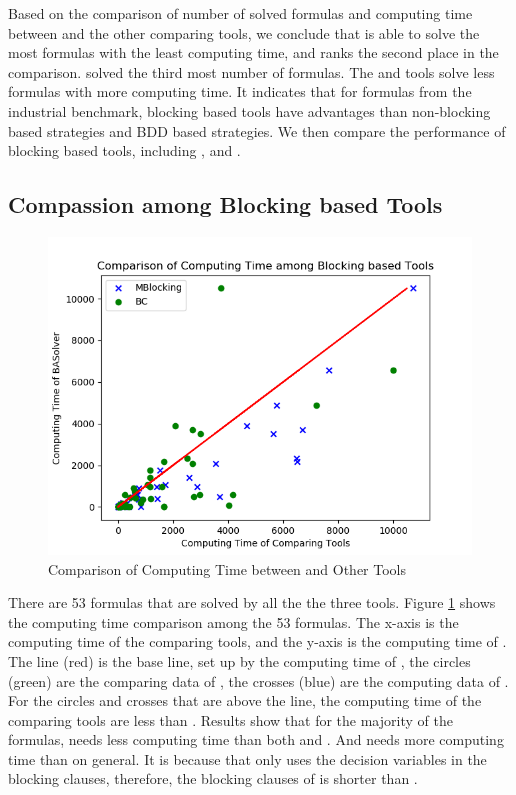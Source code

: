 Based on the comparison of number of solved formulas and computing time between \tool and the other comparing tools, we conclude that \tool is able to solve the most formulas with the least computing time, and \ctool ranks the second place in the comparison. 
\bc solved the third most number of formulas.
The \nbc and \bdd tools solve less formulas with more computing time. 
It indicates that for formulas from the industrial benchmark, blocking based tools have advantages than non-blocking based strategies and BDD based strategies.
We then compare the performance of blocking based tools, including \tool, \ctool and \bc.

\subsection{Compassion among Blocking based Tools}

\begin{figure}
    \centering
    \includegraphics[scale=0.5]{allsat-time.png}
    \caption{Comparison of Computing Time between \tool and Other Tools}
    \label{fig:All-SAT-time}
\end{figure}

There are 53 formulas that are solved by all the the three tools. Figure \ref{fig:All-SAT-time} shows the computing time comparison among the 53 formulas. The x-axis is the computing time of the comparing tools, and the y-axis is the computing time of \tool. The line (red) is the base line, set up by the computing time of \tool, the circles (green) are the comparing data of \bc, the crosses (blue) are the computing data of \ctool. For the circles and crosses that are above the line, the computing time of the comparing tools are less than \tool. Results show that for the majority of the formulas, \tool needs less computing time than both \ctool and \bc. And \ctool needs more computing time than \bc on general. It is because that \bc only uses the decision variables in the blocking clauses, therefore, the blocking clauses of \bc is shorter than \ctool. 

